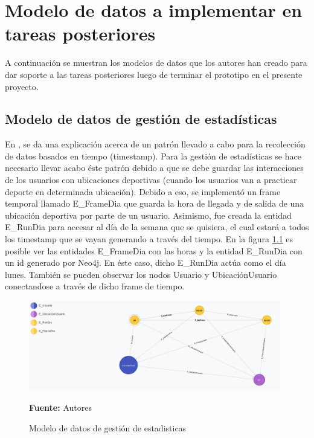 \chapter{Modelo de datos a implementar en tareas posteriores}

A continuación se muestran los modelos de datos que los autores han creado para dar soporte a las tareas posteriores luego de terminar el prototipo en el presente proyecto.


\section{Modelo de datos de gestión de estadísticas}

En \cite{dependent_time_graphs}, se da una explicación acerca de un patrón llevado a cabo para la recolección de datos basados en tiempo (timestamp). Para la gestión de estadísticas se hace necesario llevar acabo éste patrón debido a que se debe guardar las interacciones de los usuarios con ubicaciones deportivas (cuando los usuarios van a practicar deporte en determinada ubicación). Debido a eso, se implementó un frame temporal llamado E\_FrameDia que guarda la hora de llegada y de salida de una ubicación deportiva por parte de un usuario. Asimismo, fue creada la entidad E\_RunDia para accesar al día de la semana que se quisiera, el cual estará a todos los timestamp que se vayan generando a través del tiempo. En la figura \ref{fig:modelo_datos_gestion_estadisticas} es posible ver las entidades E\_FrameDia con las horas y la entidad E\_RunDia con un id generado por Neo4j. En éste caso, dicho E\_RunDia actúa como el día lunes. También se pueden observar los nodos Usuario y UbicaciónUsuario conectandose a través de dicho frame de tiempo.

\begin{figure}[!htb]
  \begin{center}
    \includegraphics[width=11cm]{./imagenes/Modelo_de_datos/Gestion_estadisticas.png}
    \caption{Modelo de datos de gestión de estadisticas}
    \label{fig:modelo_datos_gestion_estadisticas}
    \textbf{Fuente:}  Autores
  \end{center}
\end{figure}

